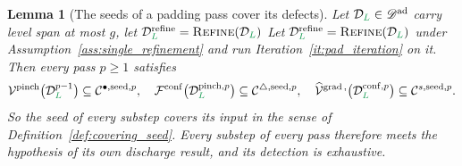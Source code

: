 \documentclass[a4paper, 12pt]{article}
\makeatletter
\newcommand{\robert}[1]{{\color{orange} #1}}
\DeclareRobustCommand{\gradeClasses}[1][]{\widehat{\V}^{\mathrm{grad} \, \ifx\@empty#1\@empty\else,#1\fi}}
\DeclareRobustCommand{\candV}[1][]{\mathcal{C}^{\bullet\ifx\@empty#1\@empty\else,#1\fi}}
\DeclareRobustCommand{\candF}[1][]{\mathcal{C}^{\triangle\ifx\@empty#1\@empty\else,#1\fi}}
\DeclareRobustCommand{\candC}[1][]{\mathcal{C}^{s\ifx\@empty#1\@empty\else,#1\fi}}
\newcommand{\green}{\color{ForestGreen}}
\newcommand{\V}{\mathcal{V}}
\newcommand{\F}{\mathcal{F}}
\renewcommand{\L}{{\green L}}
\newcommand{\allpartitions}{\mathscr{C}^{\mathrm{sp}}}
\newtheorem{lemma}[theorem]{Lemma}
\theoremstyle{definition}
\theoremstyle{plain}
\numberwithin{equation}{section}
\newcommand{\tobecut}[1]{{\color{red} #1}}     %
\DeclareRobustCommand{\domseq}[1][]{\mathcal{D}\ifx\@empty#1\@empty\else_{#1}\fi}
\renewcommand{\allpartitions}{\mathscr{D}^{\mathrm{ad}}}
\makeatother
\begin{document}
\begin{lemma}[The seeds of a padding pass cover its defects]
    \label{lemma:pad_seeds_cover}
    \tobecut{Let $\domseq[\L] \in \allpartitions$ carry level span at most $g$, let $\domseq[\L]^{\mathrm{refine}} = \textsc{Refine}(\domseq[\L])$}\robert{Let $\domseq[\L]^{\mathrm{refine}} = \textsc{Refine}(\domseq[\L])$ under Assumption~\ref{ass:single_refinement}} and run Iteration~\ref{it:pad_iteration} on it. Then every pass $p \geq 1$ satisfies
    \begin{equation}
        \label{eq:pad_seeds_cover}
        \V^{\mathrm{pinch}} \big( \domseq[\L]^{p-1} \big) \subseteq \candV[\mathrm{seed},p],
        \quad
        \F^{\mathrm{conf}} \big( \domseq[\L]^{\mathrm{pinch},p} \big) \subseteq \candF[\mathrm{seed},p],
        \quad
        \gradeClasses \big( \domseq[\L]^{\mathrm{conf},p} \big) \subseteq \candC[\mathrm{seed},p] .
    \end{equation}
    \robert{So the seed of every substep covers its input in the sense of Definition~\ref{def:covering_seed}.} Every substep of every pass therefore meets the hypothesis of its own discharge result, and its detection is exhaustive.
\end{lemma}
\end{document}
